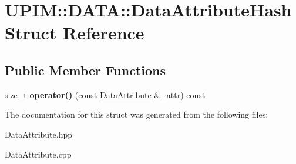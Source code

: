 \hypertarget{structUPIM_1_1DATA_1_1DataAttributeHash}{}\section{U\+P\+IM\+:\+:D\+A\+TA\+:\+:Data\+Attribute\+Hash Struct Reference}
\label{structUPIM_1_1DATA_1_1DataAttributeHash}
\subsection*{Public Member Functions}
\begin{DoxyCompactItemize}
\item 
\mbox{\label{structUPIM_1_1DATA_1_1DataAttributeHash_a92cca4c5c074be8e35520bb787da9612}} 
size\+\_\+t {\bfseries operator()} (const \hyperlink{classUPIM_1_1DATA_1_1DataAttribute}{Data\+Attribute} \&\+\_\+attr) const
\end{DoxyCompactItemize}


The documentation for this struct was generated from the following files\+:\begin{DoxyCompactItemize}
\item 
Data\+Attribute.\+hpp\item 
Data\+Attribute.\+cpp\end{DoxyCompactItemize}
